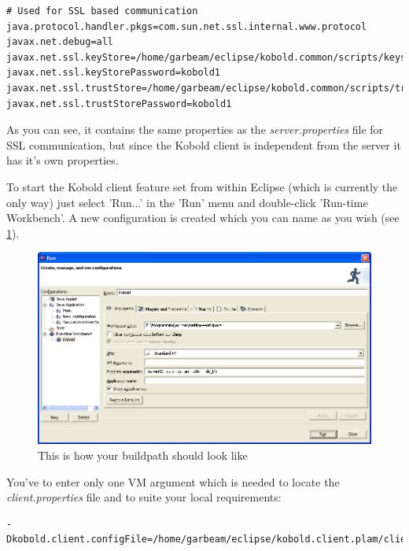 \begin{verbatim}
# Used for SSL based communication
java.protocol.handler.pkgs=com.sun.net.ssl.internal.www.protocol
javax.net.debug=all
javax.net.ssl.keyStore=/home/garbeam/eclipse/kobold.common/scripts/keystore
javax.net.ssl.keyStorePassword=kobold1
javax.net.ssl.trustStore=/home/garbeam/eclipse/kobold.common/scripts/truststore
javax.net.ssl.trustStorePassword=kobold1
\end{verbatim}

As you can see, it contains the same properties as the {\it
server.properties} file for SSL communication, but since the Kobold
client is independent from the server it has it's own properties.

To start the Kobold client feature set from within Eclipse (which is
currently the only way) just select 'Run...' in the 'Run' menu and
double-click 'Run-time Workbench'. A new configuration is created which you 
can name as you wish (see \ref{run}). 

\begin{figure}[h!]
\begin{center}
\includegraphics[width=15cm]{run.png}
   \caption{This is how your buildpath should look like}
\label{run}
\end{center}
\end{figure}\par

You've to enter only one VM argument which is needed to locate the {\it
client.properties} file and to suite your local requirements: \par

\begin{verbatim}
-Dkobold.client.configFile=/home/garbeam/eclipse/kobold.client.plam/client.properties
\end{verbatim}

